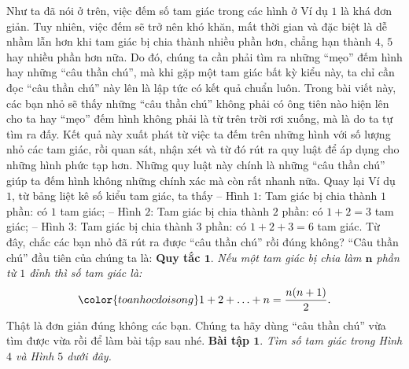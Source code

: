 	Như ta đã nói ở trên, việc đếm số tam giác trong các hình ở Ví dụ $1$ là khá đơn giản. Tuy nhiên, việc đếm sẽ trở nên khó khăn, mất thời gian và đặc biệt là dễ nhầm lẫn hơn khi tam giác bị chia thành nhiều phần hơn, chẳng hạn thành $4$, $5$ hay nhiều phần hơn nữa. Do đó, chúng ta cần phải tìm ra những “mẹo” đếm hình hay những “câu thần chú”, mà khi gặp một tam giác bất kỳ kiểu này, ta chỉ cần đọc “câu thần chú” này lên là lập tức có kết quả chuẩn luôn. 
	\vskip 0.1cm
	Trong bài viết này, các bạn nhỏ sẽ thấy những “câu thần chú” không phải có ông tiên nào hiện lên cho ta hay “mẹo” đếm hình không phải là từ trên trời rơi xuống, mà là do ta tự tìm ra đấy. Kết quả này xuất phát từ việc ta đếm trên những hình với số lượng nhỏ các tam giác, rồi quan sát, nhận xét và từ đó rút ra quy luật để áp dụng cho những hình phức tạp hơn. Những quy luật này chính là những “câu thần chú” giúp ta đếm hình không những chính xác mà còn rất nhanh nữa. 
	\vskip 0.1cm
	Quay lại Ví dụ $1$, từ bảng liệt kê số kiểu tam giác, ta thấy
	\vskip 0.1cm
	-- Hình $1$: Tam giác bị chia thành $1$ phần: có $1$ tam giác;
	\vskip 0.1cm
	-- Hình $2$: Tam giác bị chia thành $2$ phần: có $1 + 2 = 3$ tam giác;
	\vskip 0.1cm
	-- Hình $3$: Tam giác bị chia thành $3$ phần: có $1 + 2 + 3 = 6$ tam giác.
	\vskip 0.1cm
	Từ đây, chắc các bạn nhỏ đã rút ra được “câu thần chú” rồi đúng không? “Câu thần chú” đầu tiên của chúng ta là:
	\vskip 0.1cm
	\textbf{\color{toancuabi}Quy tắc $\pmb{1.}$}  \textit{Nếu một tam giác bị chia làm $\pmb{n}$ phần từ $1$ đỉnh thì số tam giác là:}
	\begin{align*}
	\color{toanhocdoisong} 1+2+\ldots+n = \frac{n(n+1)}{2}.
	\end{align*}
	Thật là đơn giản đúng không các bạn. Chúng ta hãy dùng “câu thần chú” vừa tìm được vừa rồi để làm bài tập sau nhé.
	\vskip 0.1cm
	\textbf{\color{toancuabi}Bài tập $\pmb{1.}$} \textit{Tìm số tam giác trong Hình $4$ và Hình $5$ dưới đây.}
	\begin{figure}[H]
		\centering
		\vspace*{-5pt}
		\captionsetup{labelformat= empty, justification=centering}
		\captionsetup[subfigure]{labelformat=empty}
		\hfill
		\hfill
		\hfill
		\vspace*{-10pt}
	\end{figure}   

